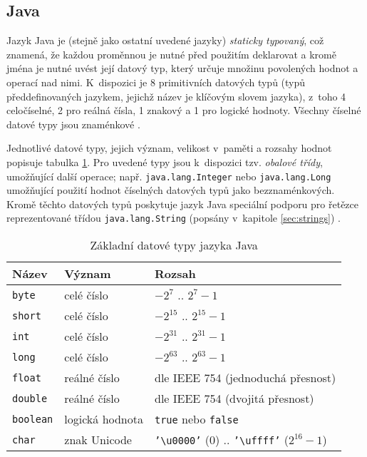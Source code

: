 \documentclass{bakalarka}
\begin{document}
\subsection{Java}
Jazyk Java je (stejně jako ostatní uvedené jazyky) \textit{staticky typovaný}, což znamená, že každou proměnnou je nutné před použitím deklarovat a kromě jména je nutné uvést její datový typ, který určuje množinu povolených hodnot a operací nad nimi. K~dispozici je 8 primitivních datových typů (typů předdefinovaných jazykem, jejichž název je klíčovým slovem jazyka), z~toho 4 celočíselné, 2 pro reálná čísla, 1 znakový a 1 pro logické hodnoty. Všechny číselné datové typy jsou znaménkové \cite{java-book, java-guide-types}.\par

Jednotlivé datové typy, jejich význam, velikost v~paměti a rozsahy hodnot popisuje tabulka \ref{table:java-types}. Pro uvedené typy jsou k~dispozici tzv. \textit{obalové třídy}, umožňující další operace; např. \texttt{java.lang.Integer} nebo \texttt{java.lang.Long} umožňující použití hodnot číselných datových typů jako bezznaménkových. Kromě těchto datových typů poskytuje jazyk Java speciální podporu pro řetězce reprezentované třídou \texttt{java.lang.String} (popsány v~kapitole \ref{sec:strings}) \cite{java-guide-types, java-guide-byte, java-guide-short, java-guide-integer, java-guide-long, java-guide-float, java-guide-double, java-guide-boolean, java-guide-character}.

\begin{table}\centering
\caption{Základní datové typy jazyka Java}
\begin{tabular}{| l | l | l |}
\hline
\textbf{Název} & \textbf{Význam} & \textbf{Rozsah} \\ \hline
\texttt{byte} & celé číslo & $-2^7$ .. $2^7-1$ \\ \hline
\texttt{short} & celé číslo & $-2^{15}$ .. $2^{15}-1$ \\ \hline
\texttt{int} & celé číslo & $-2^{31}$ .. $2^{31}-1$ \\ \hline
\texttt{long} & celé číslo & $-2^{63}$ .. $2^{63}-1$ \\ \hline
\texttt{float} & reálné číslo & dle IEEE 754 (jednoduchá přesnost) \\ \hline
\texttt{double} & reálné číslo & dle IEEE 754 (dvojitá přesnost) \\ \hline
\texttt{boolean} & logická hodnota & \texttt{true} nebo \texttt{false} \\ \hline
\texttt{char} & znak Unicode & \texttt{'\textbackslash u0000'} ($0$) .. \texttt{'\textbackslash uffff'} ($2^{16} - 1$) \\ \hline
\end{tabular}
\label{table:java-types}
\end{table}
\end{document}

